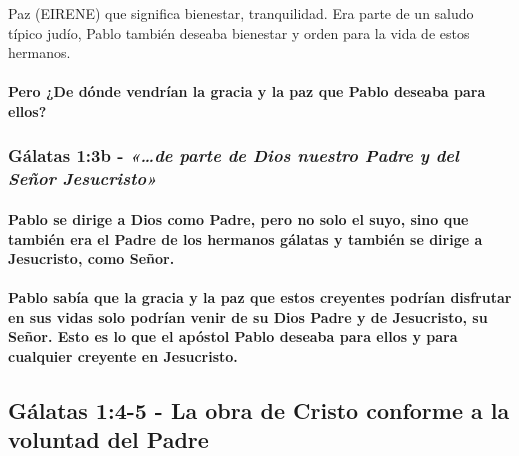 \documentclass[11a pt,twoside]{article}
\newcommand{\scripture}[1]{%
  {\fontsize{12pt}{16pt}\selectfont\ScriptureFont\itshape #1}%
}
\let\oldsubsection\subsection
\renewcommand{\subsection}{\needspace{5\baselineskip}\oldsubsection}
\let\oldsubsubsection\subsubsection
\renewcommand{\subsubsection}{\needspace{4\baselineskip}\oldsubsubsection}
\let\oldparagraph\paragraph
\renewcommand{\paragraph}{\needspace{3\baselineskip}\oldparagraph}
\begin{document}
\begin{center}
\begin{definitionbox}{Paz (EIRENE)}
que significa bienestar, tranquilidad. Era parte de un saludo típico judío, Pablo también deseaba bienestar y orden para la vida de estos hermanos.
\end{definitionbox}
\end{center}

\paragraph{Pero ¿De dónde vendrían la gracia y la paz que Pablo deseaba
para
ellos?}\label{pero-de-duxf3nde-vendruxedan-la-gracia-y-la-paz-que-pablo-deseaba-para-ellos}

\subsubsection{\texorpdfstring{Gálatas 1:3b -
\scripture{«…de parte de Dios nuestro Padre y del Señor Jesucristo»}}{Gálatas 1:3b - }}\label{guxe1latas-13b---de-parte-de-dios-nuestro-padre-y-del-seuxf1or-jesucristo}

\paragraph{Pablo se dirige a Dios como Padre, pero no solo el suyo, sino
que también era el Padre de los hermanos gálatas y también se dirige a
Jesucristo, como
Señor.}\label{pablo-se-dirige-a-dios-como-padre-pero-no-solo-el-suyo-sino-que-tambiuxe9n-era-el-padre-de-los-hermanos-guxe1latas-y-tambiuxe9n-se-dirige-a-jesucristo-como-seuxf1or.}

\paragraph{Pablo sabía que la gracia y la paz que estos creyentes
podrían disfrutar en sus vidas solo podrían venir de su Dios Padre y de
Jesucristo, su Señor. Esto es lo que el apóstol Pablo deseaba para ellos
y para cualquier creyente en
Jesucristo.}\label{pablo-sabuxeda-que-la-gracia-y-la-paz-que-estos-creyentes-podruxedan-disfrutar-en-sus-vidas-solo-podruxedan-venir-de-su-dios-padre-y-de-jesucristo-su-seuxf1or.-esto-es-lo-que-el-apuxf3stol-pablo-deseaba-para-ellos-y-para-cualquier-creyente-en-jesucristo.}

\subsection{Gálatas 1:4-5 - La obra de Cristo conforme a la voluntad del
Padre}\label{guxe1latas-14-5---la-obra-de-cristo-conforme-a-la-voluntad-del-padre}
\end{document}
